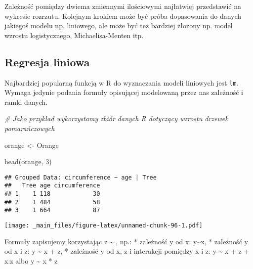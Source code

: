 \documentclass[
]{book}
\newenvironment{Shaded}{\begin{snugshade}}{\end{snugshade}}
\newcommand{\AttributeTok}[1]{\textcolor[rgb]{0.77,0.63,0.00}{#1}}
\newcommand{\CommentTok}[1]{\textcolor[rgb]{0.56,0.35,0.01}{\textit{#1}}}
\newcommand{\DecValTok}[1]{\textcolor[rgb]{0.00,0.00,0.81}{#1}}
\newcommand{\FunctionTok}[1]{\textcolor[rgb]{0.00,0.00,0.00}{#1}}
\newcommand{\NormalTok}[1]{#1}
\newcommand{\OtherTok}[1]{\textcolor[rgb]{0.56,0.35,0.01}{#1}}
\newcommand{\SpecialCharTok}[1]{\textcolor[rgb]{0.00,0.00,0.00}{#1}}
\begin{document}
Zależność pomiędzy dwiema zmiennymi ilościowymi najłatwiej przedstawić na wykresie rozrzutu. Kolejnym krokiem może być próba dopasowania do danych jakiegoś modelu np. liniowego, ale może być też bardziej złożony np. model wzrostu logistycznego, Michaelisa-Menten itp.

\hypertarget{regresja-liniowa}{%
\subsection{Regresja liniowa}\label{regresja-liniowa}}

Najbardziej popularną funkcją w R do wyznaczania modeli liniowych jest \texttt{lm}. Wymaga jedynie podania formuły opisującej modelowaną przez nas zależność i ramki danych.

\begin{Shaded}
\begin{Highlighting}[]
\CommentTok{\# Jako przykład wykorzystamy zbiór danych R dotyczący wzrostu drzewek pomarańczowych}

\NormalTok{orange }\OtherTok{\textless{}{-}}\NormalTok{ Orange}

\FunctionTok{head}\NormalTok{(orange, }\DecValTok{3}\NormalTok{)}
\end{Highlighting}
\end{Shaded}

\begin{verbatim}
## Grouped Data: circumference ~ age | Tree
##   Tree age circumference
## 1    1 118            30
## 2    1 484            58
## 3    1 664            87
\end{verbatim}

\begin{Shaded}
\end{Shaded}

\texttt{[image: \_main\_files/figure-latex/unnamed-chunk-96-1.pdf]}

Formuły zapisujemy korzystając z \textasciitilde{} , np.:
* zależność y od x: y\textasciitilde x,
* zależność y od x i z: y \textasciitilde{} x + z,
* zależność y od x, z i interakcji pomiędzy x i z: y \textasciitilde{} x + z + x:z albo y \textasciitilde{} x * z

\begin{Shaded}
\end{Shaded}
\end{document}
